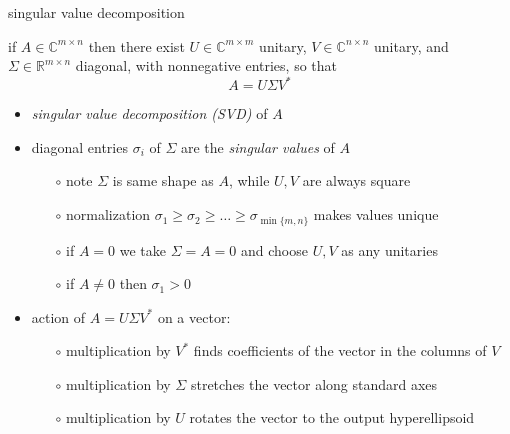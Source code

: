 \documentclass[10pt,hyperref]{beamer}
\newcommand{\CC}{\mathbb{C}}
\newcommand{\RR}{\mathbb{R}}
\begin{document}
\begin{frame}{singular value decomposition}

\begin{theorem}
 if $A\in \CC^{m\times n}$ then there exist $U\in \CC^{m\times m}$ unitary, $V \in \CC^{n\times n}$ unitary, and $\Sigma \in \RR^{m\times n}$ diagonal, with nonnegative entries, so that
    $$A = U \Sigma V^*$$
\end{theorem}

\begin{itemize}
\item \emph{singular value decomposition (SVD)} of $A$
\item diagonal entries $\sigma_i$ of $\Sigma$ are the \emph{singular values} of $A$
    \begin{itemize}
    \item[$\circ$] note $\Sigma$ is same shape as $A$, while $U,V$ are always square
    \item[$\circ$] normalization $\sigma_1\ge \sigma_2 \ge \dots \ge \sigma_{\min\{m,n\}}$ makes values unique
    \item[$\circ$] if $A=0$ we take $\Sigma=A=0$ and choose $U,V$ as any unitaries
    \item[$\circ$] if $A\ne 0$ then $\sigma_1>0$
    \end{itemize}
\item action of $A = U \Sigma V^*$ on a vector:
    \begin{itemize}
    \item[$\circ$] multiplication by $V^*$ finds coefficients of the vector in the columns of $V$
    \item[$\circ$] multiplication by $\Sigma$ stretches the vector along standard axes
    \item[$\circ$] multiplication by $U$ rotates the vector to the output hyperellipsoid
    \end{itemize}
\end{itemize}
\end{frame}
\end{document}
